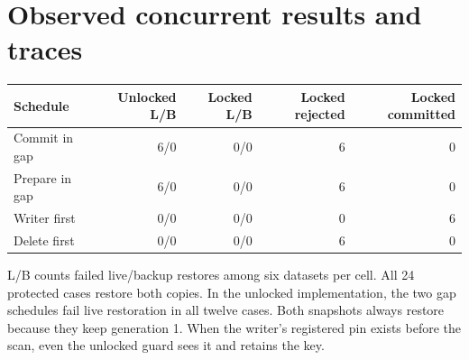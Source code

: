 \documentclass[10pt]{article}
\begin{document}
\newpage
\section{Observed concurrent results and traces}
\begin{center}\begin{tabular}{@{}lrrrr@{}}
\toprule
Schedule & Unlocked L/B & Locked L/B & Locked rejected & Locked committed\\
\midrule
Commit in gap & 6/0 & 0/0 & 6 & 0\\
Prepare in gap & 6/0 & 0/0 & 6 & 0\\
Writer first & 0/0 & 0/0 & 0 & 6\\
Delete first & 0/0 & 0/0 & 6 & 0\\
\bottomrule\end{tabular}\end{center}
L/B counts failed live/backup restores among six datasets per cell. All 24
protected cases restore both copies. In the unlocked implementation, the two
gap schedules fail live restoration in all twelve cases. Both snapshots always
restore because they keep generation 1. When the writer's registered pin exists
before the scan, even the unlocked guard sees it and retains the key.
\end{document}
